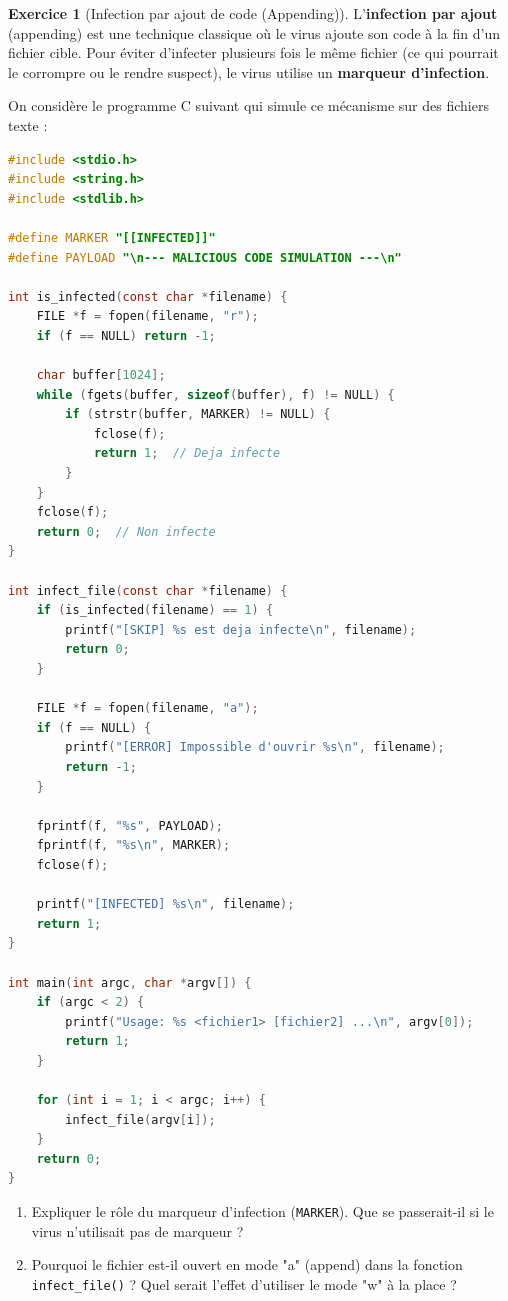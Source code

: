 \documentclass[a4paper,11pt]{article}
\theoremstyle{plain}
\theoremstyle{definition}
\newtheorem{exercice}{Exercice}
\begin{document}
\begin{exercice}[Infection par ajout de code (Appending)]

L'\textbf{infection par ajout} (appending) est une technique classique où le virus ajoute son code à la fin d'un fichier cible. Pour éviter d'infecter plusieurs fois le même fichier (ce qui pourrait le corrompre ou le rendre suspect), le virus utilise un \textbf{marqueur d'infection}.

On considère le programme C suivant qui simule ce mécanisme sur des fichiers texte :

\begin{lstlisting}[language=C]
#include <stdio.h>
#include <string.h>
#include <stdlib.h>

#define MARKER "[[INFECTED]]"
#define PAYLOAD "\n--- MALICIOUS CODE SIMULATION ---\n"

int is_infected(const char *filename) {
    FILE *f = fopen(filename, "r");
    if (f == NULL) return -1;

    char buffer[1024];
    while (fgets(buffer, sizeof(buffer), f) != NULL) {
        if (strstr(buffer, MARKER) != NULL) {
            fclose(f);
            return 1;  // Deja infecte
        }
    }
    fclose(f);
    return 0;  // Non infecte
}

int infect_file(const char *filename) {
    if (is_infected(filename) == 1) {
        printf("[SKIP] %s est deja infecte\n", filename);
        return 0;
    }

    FILE *f = fopen(filename, "a");
    if (f == NULL) {
        printf("[ERROR] Impossible d'ouvrir %s\n", filename);
        return -1;
    }

    fprintf(f, "%s", PAYLOAD);
    fprintf(f, "%s\n", MARKER);
    fclose(f);

    printf("[INFECTED] %s\n", filename);
    return 1;
}

int main(int argc, char *argv[]) {
    if (argc < 2) {
        printf("Usage: %s <fichier1> [fichier2] ...\n", argv[0]);
        return 1;
    }

    for (int i = 1; i < argc; i++) {
        infect_file(argv[i]);
    }
    return 0;
}
\end{lstlisting}

\begin{enumerate}
\item Expliquer le rôle du marqueur d'infection (\texttt{MARKER}). Que se passerait-il si le virus n'utilisait pas de marqueur ?

\item Pourquoi le fichier est-il ouvert en mode "a" (append) dans la fonction \texttt{infect\_file()} ? Quel serait l'effet d'utiliser le mode "w" à la place ?


\end{enumerate}
\end{exercice}
\end{document}
